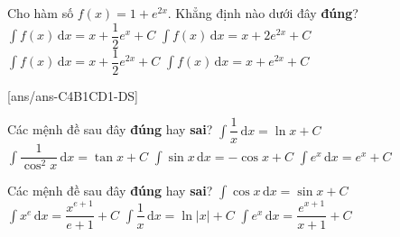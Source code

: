 \begin{ex}%
Cho hàm số $f(x)=1+e^{2x}$. Khẳng định nào dưới đây \textbf{đúng}?
\choice
{$\displaystyle\int f(x) \mathrm{\,d}x=x+\dfrac{1}{2}e^x+C$}
{$\displaystyle\int f(x) \mathrm{\,d}x=x+2e^{2x}+C$}
{\True $\displaystyle\int f(x) \mathrm{\,d}x=x+\dfrac{1}{2}e^{2x}+C$}
{$\displaystyle\int f(x) \mathrm{\,d}x=x+e^{2x}+C$}
\end{ex}
\TNTF
{}[ans/ans-C4B1CD1-DS]
\begin{ex}%
Các mệnh đề sau đây \textbf{đúng} hay \textbf{sai}?
\choiceTF
{$\displaystyle\int \dfrac{1}{x} \mathrm{\,d}x=\ln x+C$}
{\True $\displaystyle\int \dfrac{1}{\cos^2x} \mathrm{\,d}x=\tan x+C$}
{\True $\displaystyle\int \sin x \mathrm{\,d}x=-\cos x+C$}
{\True $\displaystyle\int e^x \mathrm{\,d}x=e^x+C$}
\end{ex}

\begin{ex}%
Các mệnh đề sau đây \textbf{đúng} hay \textbf{sai}?
\choiceTF
{\True $\displaystyle\int \cos x \mathrm{\,d}x=\sin x+C$}
{\True $\displaystyle\int x^e \mathrm{\,d}x=\dfrac{x^{e+1}}{e+1}+C$}
{\True $\displaystyle\int \dfrac{1}{x} \mathrm{\,d}x=\ln \left|x\right|+C$}
{$\displaystyle\int e^x \mathrm{\,d}x=\dfrac{e^{x+1}}{x+1}+C$}
\end{ex}

